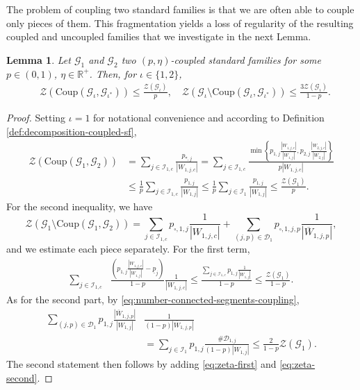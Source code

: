 \documentclass{amsart}
\numberwithin{equation}{section}
\newtheorem{lemma}[theorem]{Lemma}
\renewcommand{\le}{\leqslant}
\newcommand\cD{{\mathcal D}}
\newcommand\cG{{\mathcal G}}
\newcommand\cI{{\mathcal I}}
\newcommand\cZ{{\mathcal Z}}
\newcommand\bR{{\mathbb R}}
\newcommand{\Coup}{\text{Coup}}
\begin{document}
The problem of coupling two standard families is that we are often able to couple only pieces of them. This fragmentation yields a loss of regularity of the resulting coupled and uncoupled families that we investigate in the next Lemma. 
\begin{lemma}\label{lem:Z-coupled}
  Let \(\cG_1\) and \(\cG_2\) two \((p,\eta)\)-coupled standard families for some \(p \in (0,1)\), \(\eta \in \bR^+\). Then, for \(\iota \in \{1,2\}\), 
  \[
  \begin{split}
      &\cZ\left(\Coup(\cG_\iota,\cG_{\iota^*})\right) \le \frac{\cZ(\cG_\iota)}{p}, \quad \cZ \left(\cG_\iota \setminus \Coup(\cG_\iota,\cG_{\iota^*})\right) \le \frac{3\cZ(\cG_\iota)}{1-p}. 
  \end{split}
  \]
\end{lemma}
\begin{proof}
  Setting \(\iota = 1\) for notational convenience and according to Definition \ref{def:decomposition-coupled-sf}, 
  \[
  \begin{split}
   \cZ\left(\Coup(\cG_1,\cG_2)\right) &= \sum_{j \in  \cI_{1,c}}\frac{ p_{*,j}}{| W_{1,j,c}|} =   \sum_{j \in \cI_{1,c}} \frac{\min\left\{p_{1,j} \frac{|W_{1,j,c}|}{|W_{1,j}|}, p_{2,j} \frac{|W_{2,j,c}|}{|W_{2,j}|}\right\}}{p|W_{1,j,c}|}\\
& \le \frac{1}{p} \sum_{j \in \cI_{1,c}}\frac{p_{1,j}}{|W_{1,j}|} \le \frac{1}{p} \sum_{j \in \cI_{1}}\frac{p_{1,j}}{|W_{1,j}|}\le \frac{\cZ(\cG_1)}{p}.
  \end{split}
  \]
For the second inequality, we have
\[
  \cZ \left(\cG_1 \setminus \Coup(\cG_1,\cG_2)\right) = \sum_{j \in \cI_{1,c}} p_{\square,1,j}\frac{1}{| W_{1,j,c}|} + \sum_{(j,p) \in \cD_1} p_{\square, 1, j, p} \frac{1}{|\overline W_{1,j,p}|},
\]
and we estimate each piece separately. For the first term,
\begin{equation}\label{eq:zeta-first}
\begin{split}
    \sum_{j \in \cI_{1,c}} &\frac{\left(p_{1,j}\frac{| W_{1,j,c}|}{|W_{1,j}|} - \underline p_{j} \right)}{ 1-p}\frac{1}{|W_{1,j,c}|}\le \frac{\sum_{j \in \cI_{1,c}} p_{1,j}\frac{1}{|W_{1,j}|}}{1-p} \le \frac{\cZ(\cG_1)}{1-p}.
\end{split}
\end{equation}
As for the second part, by \eqref{eq:number-connected-segments-coupling},
\begin{equation}\label{eq:zeta-second}
\begin{split}
   \sum_{(j,p) \in \cD_1} p_{1,j}\frac{|\overline W_{1,j,p}|}{|W_{1,j}|}&\frac{1}{(1-p)|\overline W_{1,j,p}|} \\
&= \sum_{j \in \cI_1}p_{1,j}\frac{ \# \cD_{1,j} }{(1-p)|W_{1,j}|}\le \frac{2}{1-p} \cZ(\cG_1).
\end{split}
\end{equation}
The second statement then follows by adding \eqref{eq:zeta-first} and \eqref{eq:zeta-second}.
\end{proof}
\end{document}
